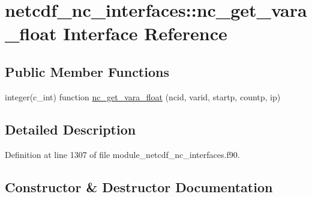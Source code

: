 \hypertarget{interfacenetcdf__nc__interfaces_1_1nc__get__vara__float}{}\section{netcdf\+\_\+nc\+\_\+interfaces\+:\+:nc\+\_\+get\+\_\+vara\+\_\+float Interface Reference}
\label{interfacenetcdf__nc__interfaces_1_1nc__get__vara__float}
\subsection*{Public Member Functions}
\begin{DoxyCompactItemize}
\item 
integer(c\+\_\+int) function \hyperlink{interfacenetcdf__nc__interfaces_1_1nc__get__vara__float_a86e94db194b7b304e812964e69740d28}{nc\+\_\+get\+\_\+vara\+\_\+float} (ncid, varid, startp, countp, ip)
\end{DoxyCompactItemize}


\subsection{Detailed Description}


Definition at line 1307 of file module\+\_\+netcdf\+\_\+nc\+\_\+interfaces.\+f90.



\subsection{Constructor \& Destructor Documentation}
\mbox{\label{interfacenetcdf__nc__interfaces_1_1nc__get__vara__float_a86e94db194b7b304e812964e69740d28}} 
